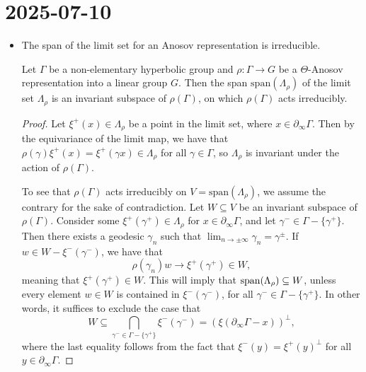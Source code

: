 \documentclass{report}
\begin{document}
\section{2025-07-10}
\begin{itemize}
    \item The span of the limit set for an Anosov representation is irreducible.
    \begin{lemma}
        Let $\Gamma$ be a non-elementary hyperbolic group and $\rho: \Gamma \to G$ be a $\Theta$-Anosov representation into a linear group $G$.
        Then the span $\mathrm{span}(\Lambda_\rho)$ of the limit set $\Lambda_\rho$ is an invariant subspace of $\rho(\Gamma)$, on which $\rho(\Gamma)$ acts irreducibly.
    \end{lemma}
    \begin{proof}
        Let $\xi^+(x) \in \Lambda_\rho$ be a point in the limit set, where $x \in \partial_\infty \Gamma$.
        Then by the equivariance of the limit map, we have that $\rho(\gamma) \xi^+(x) = \xi^+(\gamma x) \in \Lambda_\rho$ for all $\gamma \in \Gamma$, so $\Lambda_\rho$ is invariant under the action of $\rho(\Gamma)$.

        To see that $\rho(\Gamma)$ acts irreducibly on $V = \mathrm{span}(\Lambda_\rho)$, we assume the contrary for the sake of contradiction.
        Let $W \subseteq V$ be an invariant subspace of $\rho(\Gamma)$.
        Consider some $\xi^+(\gamma^+) \in \Lambda_\rho$ for $x \in \partial_\infty \Gamma$, and let $\gamma^- \in \Gamma - \{\gamma^+\}$.
        Then there exists a geodesic $\gamma_n$ such that $\lim_{n \to \pm \infty} \gamma_n = \gamma^\pm$.
        If $w \in W - \xi^-(\gamma^-)$, we have that
        \[
        \rho(\gamma_n) w \to \xi^+(\gamma^+) \in W,
        \]
        meaning that $\xi^+(\gamma^+) \in W$.
        This will imply that $\operatorname{span}(\Lambda_\rho) \subseteq W$, unless every element $w \in W$ is contained in $\xi^-(\gamma^-)$, for all $\gamma^- \in \Gamma - \{\gamma^+\}$.
        In other words, it suffices to exclude the case that 
        \[
        W \subseteq \bigcap_{\gamma^- \in \Gamma - \{\gamma^+\}} \xi^-(\gamma^-) = \left(\xi(\partial_\infty \Gamma-x)\right)^\perp,
        \]
        where the last equality follows from the fact that $\xi^-(y) = \xi^+(y)^\perp$ for all $y \in \partial_\infty \Gamma$.
        

\end{proof}
\end{itemize}
\end{document}
